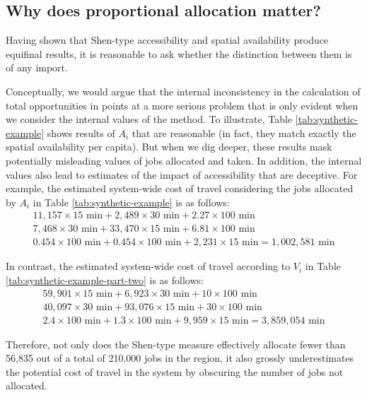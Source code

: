 \documentclass[]{elsarticle} %
\begin{document}
\hypertarget{why-does-proportional-allocation-matter}{%
\subsection{Why does proportional allocation
matter?}\label{why-does-proportional-allocation-matter}}

Having shown that Shen-type accessibility and spatial availability
produce equifinal results, it is reasonable to ask whether the
distinction between them is of any import.

Conceptually, we would argue that the internal inconsistency in the
calculation of total opportunities in \citet{shen1998} points at a more
serious problem that is only evident when we consider the internal
values of the method. To illustrate, Table \ref{tab:synthetic-example}
shows results of \(A_i\) that are reasonable (in fact, they match
exactly the spatial availability per capita). But when we dig deeper,
these results mask potentially misleading values of jobs allocated and
taken. In addition, the internal values also lead to estimates of the
impact of accessibility that are deceptive. For example, the estimated
system-wide cost of travel considering the jobs allocated by \(A_i\) in
Table \ref{tab:synthetic-example} is as follows: \[
\begin{array}{l}
11,157\times 15 \text{ min} + 2,489\times 30 \text{ min} + 2.27\times 100 \text{ min}\\
7,468\times 30 \text{ min} + 33,470\times 15 \text{ min} + 6.81\times 100 \text{ min}\\
0.454\times 100 \text{ min} + 0.454\times 100 \text{ min} + 2,231\times 15 \text{ min} = 1,002,581\text{ min}
\end{array}
\]

In contrast, the estimated system-wide cost of travel according to
\(V_i\) in Table \ref{tab:synthetic-example-part-two} is as follows: \[
\begin{array}{l}
59,901\times 15 \text{ min} + 6,923\times 30 \text{ min} + 10\times 100 \text{ min}\\
40,097\times 30 \text{ min} + 93,076\times 15 \text{ min} + 30\times 100 \text{ min}\\
2.4\times 100 \text{ min} + 1.3\times 100 \text{ min} + 9,959\times 15 \text{ min} = 3,859,054\text{ min}
\end{array}
\]

Therefore, not only does the Shen-type measure effectively allocate
fewer than 56,835 out of a total of 210,000 jobs in the region, it also
grossly underestimates the potential cost of travel in the system by
obscuring the number of jobs not allocated.
\end{document}

